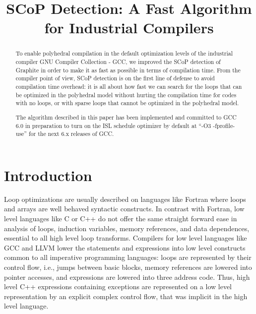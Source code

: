 \documentclass{sigplanconf}
\begin{document}
\setlength{\pdfpageheight}{\paperheight}
\setlength{\pdfpagewidth}{\paperwidth}


\title{SCoP Detection: A Fast Algorithm for Industrial Compilers}

\maketitle

\begin{abstract}
To enable polyhedral compilation in the default optimization levels of the
industrial compiler GNU Compiler Collection - GCC, we improved the SCoP
detection of Graphite in order to make it as fast as possible in terms of
compilation time.  From the compiler point of view, SCoP detection is on the
first line of defense to avoid compilation time overhead: it is all about how
fast we can search for the loops that can be optimized in the polyhedral model
without hurting the compilation time for codes with no loops, or with sparse
loops that cannot be optimized in the polyhedral model.

The algorithm described in this paper has been implemented and committed to
GCC 6.0 in preparation to turn on the ISL schedule optimizer by default at ``-O3
-fprofile-use'' for the next 6.x releases of GCC.
\end{abstract}

\section{Introduction}

Loop optimizations are usually described on languages like Fortran where loops
and arrays are well behaved syntactic constructs.  In contrast with Fortran, low
level languages like C or C++ do not offer the same straight forward ease in
analysis of loops, induction variables, memory references, and data dependences,
essential to all high level loop transforms.  Compilers for low level languages
like GCC and LLVM lower the statements and expressions into low level constructs
common to all imperative programming languages: loops are represented by their
control flow, i.e., jumps between basic blocks, memory references are lowered
into pointer accesses, and expressions are lowered into three address code.
Thus, high level C++ expressions containing exceptions are represented on a low
level representation by an explicit complex control flow, that was implicit in
the high level language.
\end{document}
